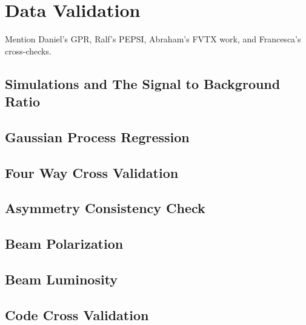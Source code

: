 \section{Data Validation}
Mention Daniel's GPR, Ralf's PEPSI, Abraham's FVTX work, and Francesca's cross-checks.
\subsection{Simulations and The Signal to Background Ratio}
\subsection{Gaussian Process Regression}
\subsection{Four Way Cross Validation}
\subsection{Asymmetry Consistency Check}
\subsection{Beam Polarization}
\subsection{Beam Luminosity}
\subsection{Code Cross Validation}

